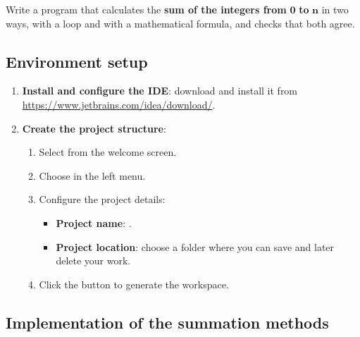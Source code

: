 Write a program that calculates the \textbf{sum of the integers from} \(\boldsymbol{0}\) \textbf{to} \(\boldsymbol{n}\) in two ways, with a loop and with a mathematical formula, and checks that both agree.

\subsection{Environment setup}

\begin{enumerate}

    \item \textbf{Install and configure the IDE}: download and install it from \url{https://www.jetbrains.com/idea/download/}.

    \item \textbf{Create the project structure}:

        \begin{enumerate}

            \item Select  from the welcome screen.

            \item Choose  in the left menu.

            \item Configure the project details:

                \begin{itemize}

                    \item \textbf{Project name}: .

                    \item \textbf{Project location}: choose a folder where you can save and later delete your work.

                \end{itemize}

            \item Click the  button to generate the workspace.

        \end{enumerate}

\end{enumerate}

\subsection{Implementation of the summation methods}

